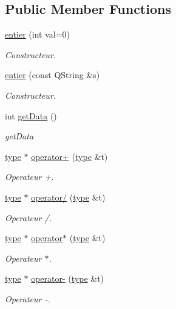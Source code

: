 \subsection*{Public Member Functions}
\begin{DoxyCompactItemize}
\item 
\hyperlink{classentier_ad1b9eb5e221dfc5006527edda8c19f8a}{entier} (int val=0)
\begin{DoxyCompactList}\small\item\em Constructeur. \end{DoxyCompactList}\item 
\hyperlink{classentier_aeee175a8cb61246f25e1ddafefebe820}{entier} (const Q\-String \&s)
\begin{DoxyCompactList}\small\item\em Constructeur. \end{DoxyCompactList}\item 
int \hyperlink{classentier_a738d3684bb420ffb5bbee2187845af85}{get\-Data} ()
\begin{DoxyCompactList}\small\item\em get\-Data \end{DoxyCompactList}\item 
\hyperlink{classtype}{type} $\ast$ \hyperlink{classentier_a531e654172d6e2fe225fad108dbb84a7}{operator+} (\hyperlink{classtype}{type} \&t)
\begin{DoxyCompactList}\small\item\em Operateur +. \end{DoxyCompactList}\item 
\hyperlink{classtype}{type} $\ast$ \hyperlink{classentier_a3bfd34b6998c5c09df0dbbadead47867}{operator/} (\hyperlink{classtype}{type} \&t)
\begin{DoxyCompactList}\small\item\em Operateur /. \end{DoxyCompactList}\item 
\hyperlink{classtype}{type} $\ast$ \hyperlink{classentier_a7314a5aad4a2c997eaea01e3aa42092a}{operator$\ast$} (\hyperlink{classtype}{type} \&t)
\begin{DoxyCompactList}\small\item\em Operateur $\ast$. \end{DoxyCompactList}\item 
\hyperlink{classtype}{type} $\ast$ \hyperlink{classentier_ac0acf2b6156ef6f5f2e034c0425e1114}{operator-\/} (\hyperlink{classtype}{type} \&t)
\begin{DoxyCompactList}\small\item\em Operateur -\/. \end{DoxyCompactList}\item 

\end{DoxyCompactItemize}
